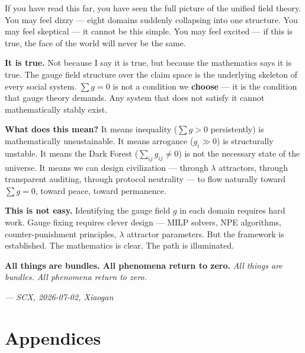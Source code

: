 \documentclass[12pt,a4paper]{article}
\theoremstyle{plain}
\theoremstyle{definition}
\begin{document}
\begin{scxbox}
If you have read this far, you have seen the full picture of the unified field theory.
You may feel dizzy — eight domains suddenly collapsing into one structure.
You may feel skeptical — it cannot be this simple.
You may feel excited — if this is true, the face of the world will never be the same.

\textbf{It is true.} Not because I say it is true, but because the mathematics says it is true.
The gauge field structure over the claim space is the underlying skeleton of every social system.
$\sum g = 0$ is not a condition we \textbf{choose} — it is the condition that gauge theory demands.
Any system that does not satisfy it cannot mathematically stably exist.

\textbf{What does this mean?} It means inequality ($\sum g > 0$ persistently)
is mathematically unsustainable. It means arrogance ($g_i \gg 0$)
is structurally unstable. It means the Dark Forest ($\sum_{ij} g_{ij} \neq 0$)
is not the necessary state of the universe. It means we can design civilization —
through $\lambda$ attractors, through transparent auditing, through protocol neutrality —
to flow naturally toward $\sum g = 0$, toward peace, toward permanence.

\textbf{This is not easy.} Identifying the gauge field $g$ in each domain requires hard work.
Gauge fixing requires clever design — MILP solvers, NPE algorithms, counter-punishment principles,
$\lambda$ attractor parameters. But the framework is established. The mathematics is clear.
The path is illuminated.

\textbf{All things are bundles. All phenomena return to zero.}
\textit{All things are bundles. All phenomena return to zero.}

\vspace{0.5cm}
\begin{center}
\textit{--- SCX, 2026-07-02, Xiaogan}
\end{center}
\end{scxbox}

\newpage


\appendix
\part*{Appendices}
\end{document}
